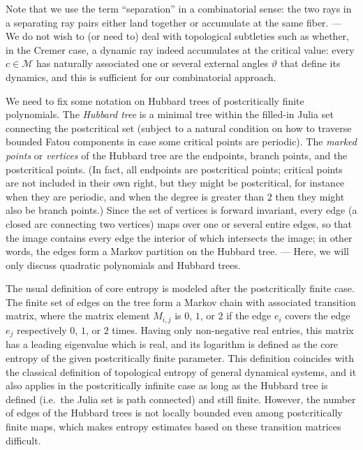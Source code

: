 \documentclass[12pt]{amsart}
\newcommand{\M}{\mathscr M}
\newcommand{\0}{\texttt{0}}
\newcommand{\1}{\texttt{1}}
\theoremstyle{definition}
\numberwithin{equation}{section}
\renewcommand{\theta}{\vartheta}
\begin{document}
Note that we use the term ``separation'' in a combinatorial sense: the two rays in a separating ray pairs either land together or accumulate at the same fiber. --- We do not wish to (or need to) deal with topological subtleties such as whether, in the Cremer case, a dynamic ray indeed accumulates at the critical value: every $c\in\M$ has naturally associated one or several external angles $\theta$ that define its dynamics, and this is sufficient for our combinatorial approach.



We need to fix some notation on Hubbard trees of postcritically finite  polynomials. The \emph{Hubbard tree} is a minimal tree within the filled-in Julia set connecting the postcritical set (subject to a natural condition on how to traverse bounded Fatou components in case some critical points are periodic). 
The \emph{marked points} or \emph{vertices} of the Hubbard tree are the endpoints, branch points, and the postcritical points. (In fact, all endpoints are postcritical points; critical points are not included in their own right, but they might be postcritical, for instance when they are periodic, and when the degree is greater than $2$ then they might also be branch points.) Since the set of vertices is forward invariant, every edge (a closed arc connecting two vertices) maps over one or several entire edges, so that the image contains every edge the interior of which intersects the image; in other words, the edges form a Markov partition on the Hubbard tree. --- Here, we will only discuss quadratic polynomials and Hubbard trees. 


The usual definition of core entropy is modeled after the postcritically finite case. The finite set of edges on the tree form a Markov chain with associated transition matrix, where the matrix element $M_{i,j}$ is $0$, $1$, or $2$ if the edge $e_i$ covers the edge $e_j$ respectively $0$, $1$, or $2$ times. Having only non-negative real entries, this matrix has a leading eigenvalue which is real, and its logarithm is defined as the core entropy of the given postcritically finite parameter. 
This definition coincides with the classical definition of topological entropy of general dynamical systems, and it also applies in the postcritically infinite case as long as the Hubbard tree is defined (i.e.\ the Julia set is path connected) and still finite. However, the number of edges of the Hubbard trees is not locally bounded even among postcritically finite maps, which makes entropy estimates based on these transition matrices difficult. 
\end{document}
